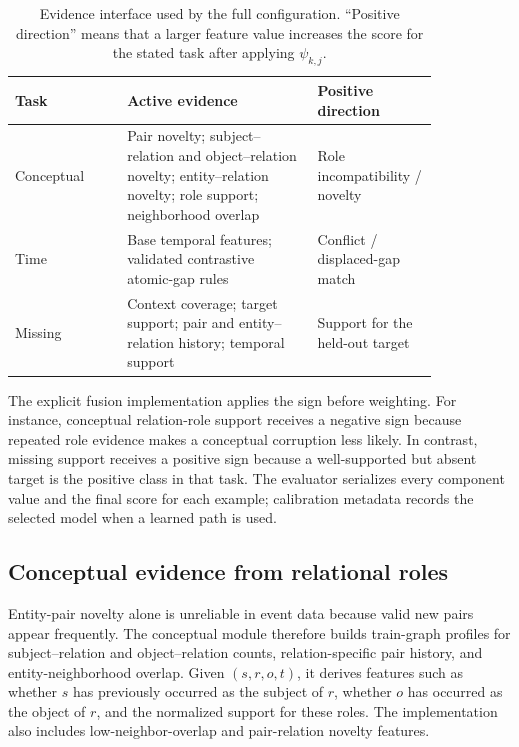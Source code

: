 \begin{table}[t]
\centering
\caption{Evidence interface used by the full configuration. ``Positive direction'' means that a larger feature value increases the score for the stated task after applying $\psi_{k,j}$.}
\label{tab:evidence-interface}
\small
\begin{tabular}{@{}p{0.23\linewidth}p{0.39\linewidth}p{0.22\linewidth}@{}}
\toprule
Task & Active evidence & Positive direction \\
\midrule
Conceptual & Pair novelty; subject--relation and object--relation novelty; entity--relation novelty; role support; neighborhood overlap & Role incompatibility / novelty \\
Time & Base temporal features; validated contrastive atomic-gap rules & Conflict / displaced-gap match \\
Missing & Context coverage; target support; pair and entity--relation history; temporal support & Support for the held-out target \\
\bottomrule
\end{tabular}
\end{table}

The explicit fusion implementation applies the sign before weighting. For instance, conceptual relation-role support receives a negative sign because repeated role evidence makes a conceptual corruption less likely. In contrast, missing support receives a positive sign because a well-supported but absent target is the positive class in that task. The evaluator serializes every component value and the final score for each example; calibration metadata records the selected model when a learned path is used.

\subsection{Conceptual evidence from relational roles}

Entity-pair novelty alone is unreliable in event data because valid new pairs appear frequently. The conceptual module therefore builds train-graph profiles for subject--relation and object--relation counts, relation-specific pair history, and entity-neighborhood overlap. Given $(s,r,o,t)$, it derives features such as whether $s$ has previously occurred as the subject of $r$, whether $o$ has occurred as the object of $r$, and the normalized support for these roles. The implementation also includes low-neighbor-overlap and pair-relation novelty features.

